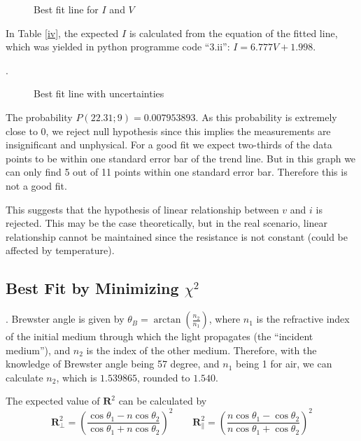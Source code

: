 \documentclass[12pt]{article}
\begin{document}
{\begin{figure}[H]
\caption{Best fit line for $I$ and $V$}
\end{figure}


In Table \eqref{iv}, the expected $I$ is calculated from the equation of the fitted line, which was yielded in python programme code ``3.ii'': $I=6.777V+1.998$. 




. 
\begin{figure}[H]

\caption{Best fit line with uncertainties}
\end{figure}




The probability $P(22.31;9) = 0.007953893$. As this probability is extremely close to 0, we reject null hypothesis since this implies the measurements are insignificant and unphysical. For a good fit we expect two-thirds of the data points to be within one standard error bar of the trend line. But in this graph we can only find 5 out of 11 points within one standard error bar. Therefore this is not a good fit.

This suggests that the hypothesis of linear relationship between $v$ and $i$ is rejected. This may be the case theoretically, but in the real scenario, linear relationship cannot be maintained since the resistance is not constant (could be affected by temperature).



\subsection{Best Fit by Minimizing $\chi^2$}
. Brewster angle is given by $\theta_B=\arctan(\frac{n_2}{n_1})$, 
where $n_1$ is the refractive index of the initial medium through which the light propagates (the ``incident medium''), and $n_2$ is the index of the other medium. Therefore, with the knowledge of Brewster angle being 57 degree, and $n_1$ being 1 for air, we can calculate $n_2$, which is $1.539865$, rounded to $1.540$. 

The expected value of $\mathbf{R}^2$ can be calculated by 
\begin{equation}
\mathbf{R}^2_{\perp}= \left(\frac{\cos \theta_1 - n\cos \theta_2}{\cos \theta_1+n\cos \theta_2}\right)^2 \qquad \mathbf{R}^2_{\parallel}= \left(\frac{n\cos \theta_1 - \cos \theta_2}{n\cos \theta_1+\cos \theta_2}\right)^2
\end{equation}

}
\end{document}
